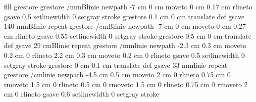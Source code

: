 {{        \tx@setTransparency fill 
    grestore
grestore
 /mmBlinie { newpath
                   -7 cm 0 cm moveto
                    0 cm 0.17 cm rlineto
                     gsave
                     0.5 setlinewidth
                     0 setgray
                     stroke
                     grestore
                      0.1 cm 0 cm translate
                    } def
gsave
140 {mmBlinie} repeat
grestore
   /cmBlinie { newpath
                   -7 cm 0 cm moveto
                    0 cm 0.27 cm rlineto
                     gsave
                     0.55 setlinewidth
                     0 setgray
                     stroke
                     grestore
                      0.5 cm 0 cm translate
                    } def
gsave
   29 {cmBlinie} repeat
grestore
/mmlinie { newpath
                   -2.3 cm 0.3 cm moveto
                    0.2 cm 0 rlineto
                    2.2 cm 0.3 cm moveto
                    0.2 cm 0 rlineto
                     gsave
                     0.5 setlinewidth
                     0 setgray
                     stroke
                     grestore
                      0 cm 0.1 cm translate
                    } def
gsave
33 {mmlinie} repeat
grestore
/cmlinie { newpath
                   -4.5 cm 0.5 cm moveto
                    2 cm 0 rlineto
                    0.75 cm 0 rmoveto
                    1.5 cm 0 rlineto
                    0.5 cm 0 rmoveto
                    1.5 cm 0 rlineto
                    0.75 cm 0 rmoveto
                    2 cm 0 rlineto
                     gsave
                     0.6 setlinewidth
                     0 setgray
                     stroke
}}}
